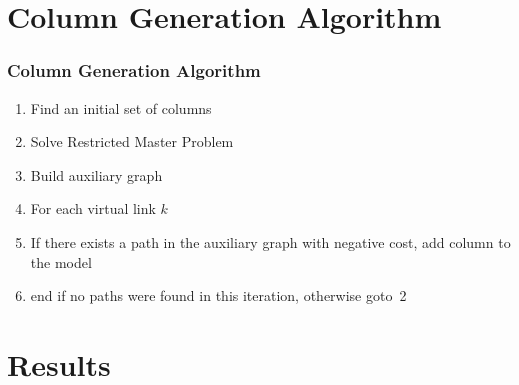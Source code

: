 \documentclass[english]{beamer}
\begin{document}
\section{Column Generation Algorithm}
\begin{frame}
\frametitle{Column Generation Algorithm}
\begin{enumerate}
	\item Find an initial set of columns
	\item Solve Restricted Master Problem
	\item Build auxiliary graph
	\item For each virtual link $k$
	\item \quad If there exists a path in the auxiliary graph with negative cost, add column to the model
	\item end if no paths were found in this iteration, otherwise goto~2
\end{enumerate}
\end{frame}
\section{Results}
\end{document}
